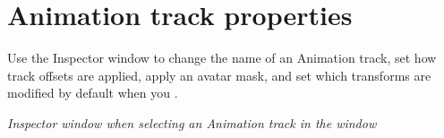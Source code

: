 \chapter{Animation track properties}
\hypertarget{md__library_2_package_cache_2com_8unity_8timeline_0d1_87_86_2_documentation_0i_2insp__trk__anim}{}\label{md__library_2_package_cache_2com_8unity_8timeline_0d1_87_86_2_documentation_0i_2insp__trk__anim}
\label{md__library_2_package_cache_2com_8unity_8timeline_0d1_87_86_2_documentation_0i_2insp__trk__anim_autotoc_md1184}%
%
 Use the Inspector window to change the name of an Animation track, set how track offsets are applied, apply an avatar mask, and set which transforms are modified by default when you .



{\itshape Inspector window when selecting an Animation track in the  window}

